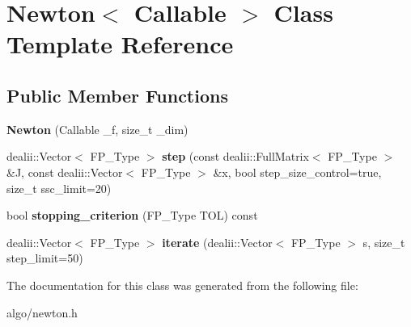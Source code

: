 \hypertarget{classNewton}{}\section{Newton$<$ Callable $>$ Class Template Reference}
\label{classNewton}
\subsection*{Public Member Functions}
\begin{DoxyCompactItemize}
\item 
\mbox{\label{classNewton_ae4ba28e81968382bfdd3213bbc762611}} 
{\bfseries Newton} (Callable \+\_\+f, size\+\_\+t \+\_\+dim)
\item 
\mbox{\label{classNewton_a2e7db9daefa5fb97a77de03cadd132e4}} 
dealii\+::\+Vector$<$ F\+P\+\_\+\+Type $>$ {\bfseries step} (const dealii\+::\+Full\+Matrix$<$ F\+P\+\_\+\+Type $>$ \&J, const dealii\+::\+Vector$<$ F\+P\+\_\+\+Type $>$ \&x, bool step\+\_\+size\+\_\+control=true, size\+\_\+t ssc\+\_\+limit=20)
\item 
\mbox{\label{classNewton_ab3fde95489168338724e34d35a17d58d}} 
bool {\bfseries stopping\+\_\+criterion} (F\+P\+\_\+\+Type T\+OL) const
\item 
\mbox{\label{classNewton_a7914b92f40c22ddc30926657663c386d}} 
dealii\+::\+Vector$<$ F\+P\+\_\+\+Type $>$ {\bfseries iterate} (dealii\+::\+Vector$<$ F\+P\+\_\+\+Type $>$ s, size\+\_\+t step\+\_\+limit=50)
\end{DoxyCompactItemize}


The documentation for this class was generated from the following file\+:\begin{DoxyCompactItemize}
\item 
algo/newton.\+h\end{DoxyCompactItemize}
